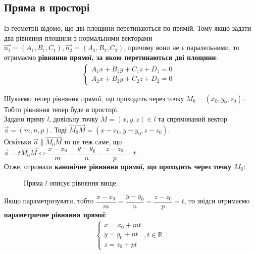 \documentclass[a4paper, 10pt]{extarticle}
\theoremstyle{theoremdd}
\theoremstyle{theoremdd}
\theoremstyle{theoremdd}
\theoremstyle{theoremdd}
\theoremstyle{theoremdd}
\theoremstyle{theoremdd}
\theoremstyle{theoremdd}
\theoremstyle{theoremdd}
\begin{document}
\subsection{Пряма в просторі}
Із геометрії відомо, що дві площини перетинаються по прямій. Тому якщо задати два рівняння площини з нормальними векторами $\vec{n_1} = (A_1,B_1,C_1), \vec{n_2} = (A_2,B_2,C_2)$, причому вони не є паралельними, то отримаємо \textbf{рівняння прямої, за якою перетинаються дві площини}:
\begin{align*}
\begin{cases}
A_1x + B_1y + C_1z + D_1 = 0 \\
A_2x + B_2y + C_2z + D_2 = 0
\end{cases}
\end{align*}

Шукаємо тепер рівняння прямої, що проходить через точку $M_0 = (x_0, y_0,z_0)$. Тобто рівняння тепер буде в просторі.\\
Задано пряму $l$, довільну точку $M = (x,y,z) \in l$ та спрямований вектор $\vec{a} = (m,n,p)$. Тоді $\overrightarrow{M_0M} = (x-x_0, y-y_0, z-z_0)$.\\
Оскільки $\vec{a} \parallel \overrightarrow{M_0M}$ то це теж саме, що $\vec{a} = t \overrightarrow{M_0 M} \iff \dfrac{x-x_0}{m} = \dfrac{y-y_0}{n} = \dfrac{z-z_0}{p} = t$.\\
Отже, отримали \textbf{канонічне рівняння прямої, що проходить через точку $M_0$}:
\begin{figure}[H]
\centering
{}
\caption*{Пряма $l$ описує рівняння вище.}
\end{figure}

Якщо параметризувати, тобто $\dfrac{x-x_0}{m} = \dfrac{y-y_0}{n} = \dfrac{z-z_0}{p} = t$, то звідси отримаємо \textbf{параметричне рівняння прямої}:
\begin{align*}
\begin{cases}
x = x_0 + mt\\
y = y_0 + nt\\
z = z_0 + pt
\end{cases}, t \in \mathbb{R}
\end{align*}
\end{document}
